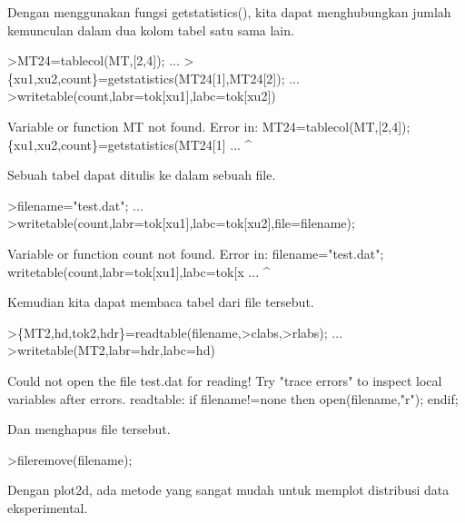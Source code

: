 \documentclass[a4paper,10pt]{article}
\begin{document}
\begin{eulernotebook}
\begin{eulercomment}
Dengan menggunakan fungsi getstatistics(), kita dapat menghubungkan
jumlah kemunculan dalam dua kolom tabel satu sama lain.
\end{eulercomment}
\begin{eulerprompt}
>MT24=tablecol(MT,[2,4]); ...
>\{xu1,xu2,count\}=getstatistics(MT24[1],MT24[2]); ...
>writetable(count,labr=tok[xu1],labc=tok[xu2])
\end{eulerprompt}
\begin{euleroutput}
  Variable or function MT not found.
  Error in:
  MT24=tablecol(MT,[2,4]); \{xu1,xu2,count\}=getstatistics(MT24[1] ...
                  ^
\end{euleroutput}
\begin{eulercomment}
Sebuah tabel dapat ditulis ke dalam sebuah file.
\end{eulercomment}
\begin{eulerprompt}
>filename="test.dat"; ...
>writetable(count,labr=tok[xu1],labc=tok[xu2],file=filename);
\end{eulerprompt}
\begin{euleroutput}
  Variable or function count not found.
  Error in:
  filename="test.dat"; writetable(count,labr=tok[xu1],labc=tok[x ...
                                       ^
\end{euleroutput}
\begin{eulercomment}
Kemudian kita dapat membaca tabel dari file tersebut.
\end{eulercomment}
\begin{eulerprompt}
>\{MT2,hd,tok2,hdr\}=readtable(filename,>clabs,>rlabs); ...
>writetable(MT2,labr=hdr,labc=hd)
\end{eulerprompt}
\begin{euleroutput}
  Could not open the file
  test.dat
  for reading!
  Try "trace errors" to inspect local variables after errors.
  readtable:
      if filename!=none then open(filename,"r"); endif;
\end{euleroutput}
\begin{eulercomment}
Dan menghapus file tersebut.
\end{eulercomment}
\begin{eulerprompt}
>fileremove(filename);
\end{eulerprompt}
\begin{eulercomment}
Dengan plot2d, ada metode yang sangat mudah untuk memplot distribusi
data eksperimental.
\end{eulercomment}

\end{eulernotebook}
\end{document}
